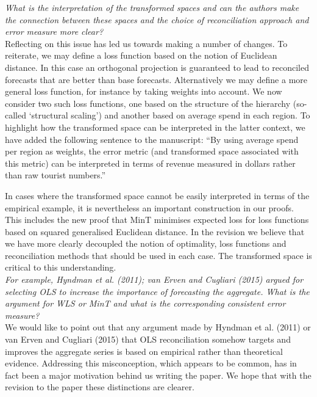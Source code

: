 \documentclass[a4paper,11pt]{article}
\begin{document}
\begin{enumerate}
		\textit{What is the interpretation of the transformed spaces and can the authors make the connection	between these spaces and the choice of reconciliation approach and error measure more clear?}\\
	
	
	    Reflecting on this issue has led us towards making a number of changes.  To reiterate, we may define a loss function based on the notion of Euclidean distance.  In this case an orthogonal projection is guaranteed to lead to reconciled forecasts that are better than base forecasts.  Alternatively we may define a more general loss function, for instance by taking weights into account.  We now consider two such loss functions, one based on the structure of the hierarchy (so-called `structural scaling') and another based on average spend in each region.  To highlight how the transformed space can be interpreted in the latter context, we have added the following sentence to the manuscript: ``By using average spend per region as weights, the error metric (and transformed space associated with this metric) can be interpreted in terms of revenue measured in dollars rather than raw tourist numbers.''
	
	    In cases where the transformed space cannot be easily interpreted in terms of the empirical example, it is nevertheless an important construction in our proofs.  This includes the new proof that MinT minimises expected loss for loss functions based on squared generalised Euclidean distance.  In the revision we believe that we have more clearly decoupled the notion of optimality, loss functions and reconciliation methods that should be used in each case.  The transformed space is critical to this understanding.\\
		
		\textit{For example, Hyndman et al. (2011); van Erven and
		Cugliari (2015) argued for selecting OLS to increase the importance of
		forecasting the aggregate. What is the argument for WLS or MinT and
		what is the corresponding consistent error measure?}\\
	
	    We would like to point out that any argument made by Hyndman et al. (2011) or van Erven and Cugliari (2015) that OLS reconciliation somehow targets and improves the aggregate series is based on empirical rather than theoretical evidence.  Addressing this misconception, which appears to be common, has in fact been a major motivation behind us writing the paper.  We hope that with the revision to the paper these distinctions are clearer.\\
	
	    \end{enumerate}
	
\end{document}
